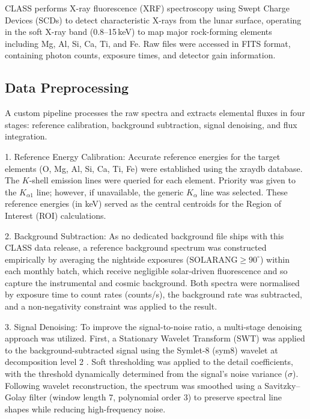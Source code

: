 \documentclass[journal,lettersize]{IEEEtran}
\begin{document}
CLASS performs X-ray fluorescence (XRF) spectroscopy using Swept Charge Devices (SCDs) to detect characteristic X-rays from the lunar surface, operating in the soft X-ray band (0.8--15\,keV) to map major rock-forming elements including Mg, Al, Si, Ca, Ti, and Fe. Raw files were accessed in FITS format, containing photon counts, exposure times, and detector gain information.

\subsection{Data Preprocessing}

A custom pipeline processes the raw spectra and extracts elemental fluxes in four stages: reference calibration, background subtraction, signal denoising, and flux integration.

1. Reference Energy Calibration:
Accurate reference energies for the target elements (O, Mg, Al, Si, Ca, Ti, Fe) were established using the xraydb database. The $K$-shell emission lines were queried for each element. Priority was given to the $K_{\alpha1}$ line; however, if unavailable, the generic $K_{\alpha}$ line was selected. These reference energies (in keV) served as the central centroids for the Region of Interest (ROI) calculations.

2. Background Subtraction:
As no dedicated background file ships with this CLASS data release, a reference background spectrum was constructed empirically by averaging the nightside exposures ($\mathrm{SOLARANG} \geq 90^{\circ}$) within each monthly batch, which receive negligible solar-driven fluorescence and so capture the instrumental and cosmic background. Both spectra were normalised by exposure time to count rates (counts/s), the background rate was subtracted, and a non-negativity constraint was applied to the result.

3. Signal Denoising:
To improve the signal-to-noise ratio, a multi-stage denoising approach was utilized. First, a Stationary Wavelet Transform (SWT) was applied to the background-subtracted signal using the Symlet-8 (sym8) wavelet at decomposition level 2 \cite{Mallat2009}. Soft thresholding was applied to the detail coefficients, with the threshold dynamically determined from the signal's noise variance ($\sigma$). Following wavelet reconstruction, the spectrum was smoothed using a Savitzky--Golay filter (window length 7, polynomial order 3) \cite{Savitzky1964} to preserve spectral line shapes while reducing high-frequency noise.
\end{document}

